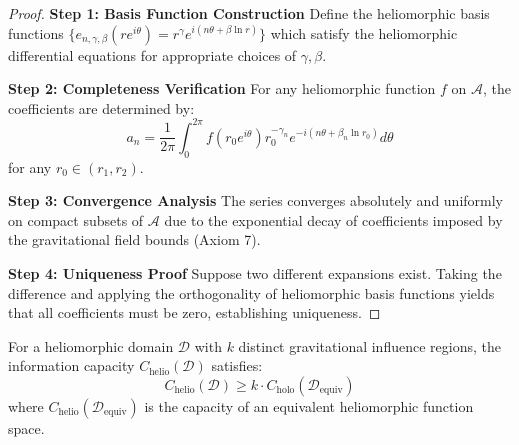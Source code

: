 \begin{proof}
\textbf{Step 1: Basis Function Construction}
Define the heliomorphic basis functions $\{e_{n,\gamma,\beta}(re^{i\theta}) = r^\gamma e^{i(n\theta + \beta \ln r)}\}$ which satisfy the heliomorphic differential equations for appropriate choices of $\gamma, \beta$.

\textbf{Step 2: Completeness Verification}
For any heliomorphic function $f$ on $\mathcal{A}$, the coefficients are determined by:
$$a_n = \frac{1}{2\pi} \int_0^{2\pi} f(r_0 e^{i\theta}) r_0^{-\gamma_n} e^{-i(n\theta + \beta_n \ln r_0)} d\theta$$
for any $r_0 \in (r_1, r_2)$.

\textbf{Step 3: Convergence Analysis}
The series converges absolutely and uniformly on compact subsets of $\mathcal{A}$ due to the exponential decay of coefficients imposed by the gravitational field bounds (Axiom 7).

\textbf{Step 4: Uniqueness Proof}
Suppose two different expansions exist. Taking the difference and applying the orthogonality of heliomorphic basis functions yields that all coefficients must be zero, establishing uniqueness.
\end{proof}

\begin{theorem}
\label{thm:information_capacity}
For a heliomorphic domain $\mathcal{D}$ with $k$ distinct gravitational influence regions, the information capacity $C_{\text{helio}}(\mathcal{D})$ satisfies:
$$C_{\text{helio}}(\mathcal{D}) \geq k \cdot C_{\text{holo}}(\mathcal{D}_{\text{equiv}})$$
where $C_{\text{helio}}(\mathcal{D}_{\text{equiv}})$ is the capacity of an equivalent heliomorphic function space.
\end{theorem}


